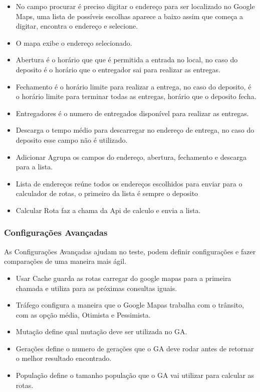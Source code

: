 \begin{itemize}
	\item No campo procurar é preciso digitar o endereço para ser localizado no Google Maps, uma lista de possíveis escolhas aparece a baixo assim que começa a digitar, encontra o endereço e selecione.
	\item O mapa exibe o endereço selecionado.
	\item Abertura é o horário que que é permitida a entrada no local, no caso do deposito é o horário que o entregador sai para realizar as entregas.
	\item Fechamento é o horário limite para realizar a entrega, no caso do deposito, é o horário limite para terminar todas as entregas, horário que o deposito fecha.
	\item Entregadores é o numero de entregados disponível para realizar as entregas.
	\item Descarga o tempo médio para descarregar no endereço de entrega, no caso do deposito esse campo não é utilizado.
	\item Adicionar Agrupa os campos do endereço, abertura, fechamento e descarga para a lista.
	\item Lista de endereços reúne todos os endereços escolhidos para enviar para o calculador de rotas, o primeiro da lista é sempre o deposito
	\item Calcular Rota faz a chama da Api de calculo e envia a lista.
\end{itemize}

\subsubsection{Configurações Avançadas}
As Configurações Avançadas ajudam no teste, podem definir configurações e fazer comparações de uma maneira mais ágil.
\begin{itemize}
	\item Usar Cache guarda as rotas carregar do google mapas para a primeira chamada e utiliza para as próximas consultas iguais.
	\item Tráfego configura a maneira que o Google Mapas trabalha com o trânsito, com as opção média, Otimista e Pessimista.
	\item Mutação define qual mutação deve ser utilizada no GA.
	\item Gerações define o numero de gerações que o GA deve rodar antes de retornar o melhor resultado encontrado.
	\item População define o tamanho população que o GA vai utilizar para calcular as rotas.
\end{itemize}

